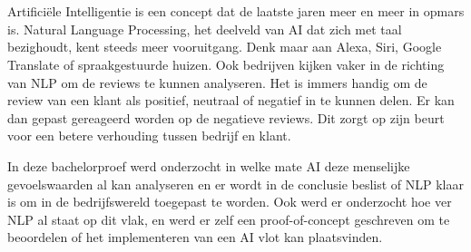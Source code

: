 
%



\chapter*{}

Artificiële Intelligentie is een concept dat de laatste jaren meer en meer in opmars is. Natural Language Processing, het deelveld van AI dat zich met taal bezighoudt, kent steeds meer vooruitgang. Denk maar aan Alexa, Siri, Google Translate of spraakgestuurde huizen. Ook bedrijven kijken vaker in de richting van NLP om de reviews te kunnen analyseren. Het is immers handig om de review van een klant als positief, neutraal of negatief in te kunnen delen. Er kan dan gepast gereageerd worden op de negatieve reviews. Dit zorgt op zijn beurt voor een betere verhouding tussen bedrijf en klant.

In deze bachelorproef werd onderzocht in welke mate AI deze menselijke gevoelswaarden al kan analyseren en er wordt in de conclusie beslist of NLP klaar is om in de bedrijfswereld toegepast te worden. Ook werd er onderzocht hoe ver NLP al staat op dit vlak, en werd er zelf een proof-of-concept geschreven om te beoordelen of het implementeren van een AI vlot kan plaatsvinden. 

